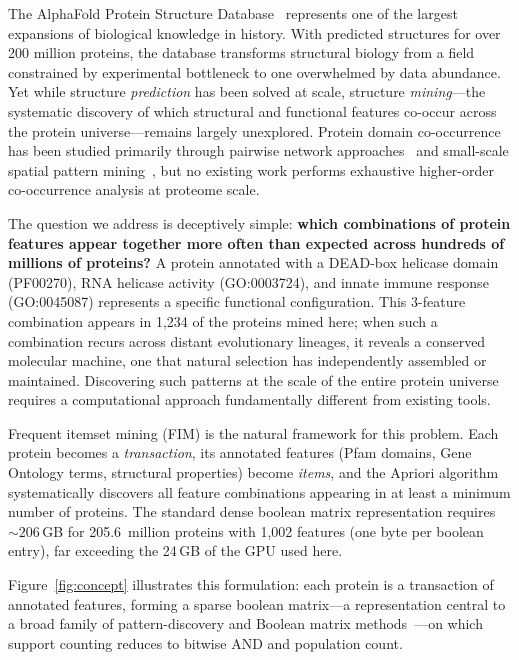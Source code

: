 \documentclass[10pt,a4paper,twocolumn]{article}
\begin{document}
The AlphaFold Protein Structure Database~\cite{jumper2021,varadi2022,varadi2024} represents one of the largest expansions of biological knowledge in history. With predicted structures for over 200 million proteins, the database transforms structural biology from a field constrained by experimental bottleneck to one overwhelmed by data abundance. Yet while structure \emph{prediction} has been solved at scale, structure \emph{mining}---the systematic discovery of which structural and functional features co-occur across the protein universe---remains largely unexplored. Protein domain co-occurrence has been studied primarily through pairwise network approaches~\cite{wang2011,coin2009} and small-scale spatial pattern mining~\cite{meysman2015}, but no existing work performs exhaustive higher-order co-occurrence analysis at proteome scale.

The question we address is deceptively simple: \textbf{which combinations of protein features appear together more often than expected across hundreds of millions of proteins?} A protein annotated with a DEAD-box helicase domain (PF00270), RNA helicase activity (GO:0003724), and innate immune response (GO:0045087) represents a specific functional configuration. This 3-feature combination appears in 1,234 of the proteins mined here; when such a combination recurs across distant evolutionary lineages, it reveals a conserved molecular machine, one that natural selection has independently assembled or maintained. Discovering such patterns at the scale of the entire protein universe requires a computational approach fundamentally different from existing tools.

Frequent itemset mining (FIM) is the natural framework for this problem. Each protein becomes a \emph{transaction}, its annotated features (Pfam domains, Gene Ontology terms, structural properties) become \emph{items}, and the Apriori algorithm~\cite{agrawal1994} systematically discovers all feature combinations appearing in at least a minimum number of proteins. The standard dense boolean matrix representation requires ${\sim}206$\,GB for 205.6~million proteins with 1,002 features (one byte per boolean entry), far exceeding the 24\,GB of the GPU used here.

Figure~\ref{fig:concept} illustrates this formulation: each protein is a transaction of annotated features, forming a sparse boolean matrix---a representation central to a broad family of pattern-discovery and Boolean matrix methods~\cite{miettinen2020}---on which support counting reduces to bitwise AND and population count.
\end{document}
